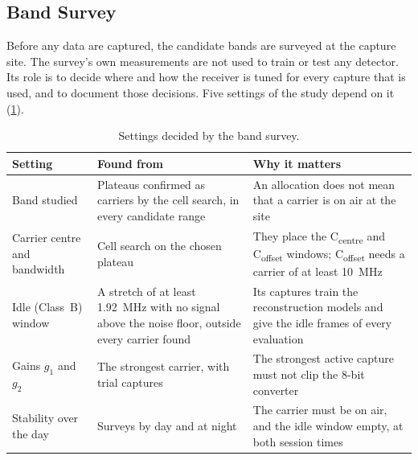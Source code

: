 \subsection{Band Survey}
\label{sec:m-survey}

Before any data are captured, the candidate bands are surveyed at the capture site. The survey's own measurements are not used to train or test any detector. Its role is to decide where and how the receiver is tuned for every capture that is used, and to document those decisions. Five settings of the study depend on it (\cref{tab:m-survey-role}).

\begin{table}[tbp]
  \centering
  \small
  \caption[Settings decided by the band survey]{Settings decided by the band survey.}
  \label{tab:m-survey-role}
  \begin{tabularx}{\textwidth}{@{} >{\raggedright\arraybackslash}p{3.0cm} >{\raggedright\arraybackslash}X >{\raggedright\arraybackslash}X @{}}
    \toprule
    Setting & Found from & Why it matters \\
    \midrule
    Band studied & Plateaus confirmed as carriers by the cell search, in every candidate range & An allocation does not mean that a carrier is on air at the site \\
    Carrier centre and bandwidth & Cell search on the chosen plateau & They place the C\textsubscript{centre} and C\textsubscript{offset} windows; C\textsubscript{offset} needs a carrier of at least \qty{10}{\mega\hertz} \\
    Idle (Class~B) window & A stretch of at least \qty{1.92}{\mega\hertz} with no signal above the noise floor, outside every carrier found & Its captures train the reconstruction models and give the idle frames of every evaluation \\
    Gains $g_1$ and $g_2$ & The strongest carrier, with trial captures & The strongest active capture must not clip the 8-bit converter \\
    Stability over the day & Surveys by day and at night & The carrier must be on air, and the idle window empty, at both session times \\
    \bottomrule
  \end{tabularx}
\end{table}

